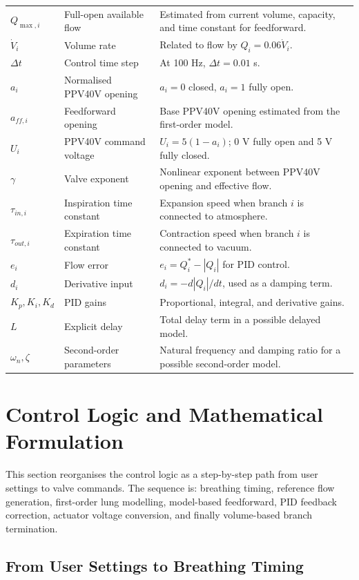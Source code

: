\documentclass[11pt,a4paper]{article}
\begin{document}
\begin{table}[H]
\begin{tabularx}{0.96\textwidth}{
  >{\centering\arraybackslash}p{2.0cm}
  >{\raggedright\arraybackslash}p{3.2cm}
  X
}
$Q_{\max,i}$ & Full-open available flow & Estimated from current volume, capacity, and time constant for feedforward. \\
$\dot V_i$ & Volume rate & Related to flow by $Q_i=0.06\dot V_i$. \\
$\Delta t$ & Control time step & At 100 Hz, $\Delta t=0.01$ s. \\
$a_i$ & Normalised PPV40V opening & $a_i=0$ closed, $a_i=1$ fully open. \\
$a_{ff,i}$ & Feedforward opening & Base PPV40V opening estimated from the first-order model. \\
$U_i$ & PPV40V command voltage & $U_i=5(1-a_i)$; 0 V fully open and 5 V fully closed. \\
$\gamma$ & Valve exponent & Nonlinear exponent between PPV40V opening and effective flow. \\
$\tau_{in,i}$ & Inspiration time constant & Expansion speed when branch $i$ is connected to atmosphere. \\
$\tau_{out,i}$ & Expiration time constant & Contraction speed when branch $i$ is connected to vacuum. \\
$e_i$ & Flow error & $e_i=Q^*_i-|Q_i|$ for PID control. \\
$d_i$ & Derivative input & $d_i=-d|Q_i|/dt$, used as a damping term. \\
$K_p,K_i,K_d$ & PID gains & Proportional, integral, and derivative gains. \\
$L$ & Explicit delay & Total delay term in a possible delayed model. \\
$\omega_n,\zeta$ & Second-order parameters & Natural frequency and damping ratio for a possible second-order model. \\
\bottomrule
\end{tabularx}
\end{table}

\section{Control Logic and Mathematical Formulation}

This section reorganises the control logic as a step-by-step path from user settings to valve commands. The sequence is: breathing timing, reference flow generation, first-order lung modelling, model-based feedforward, PID feedback correction, actuator voltage conversion, and finally volume-based branch termination.

\subsection{From User Settings to Breathing Timing}
\end{document}
